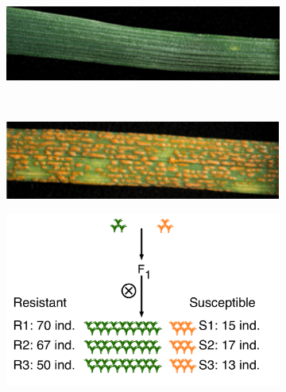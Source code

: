 \label{sub:mappingPopulation}
\begin{figure}
    \centering
     
     \begin{subfigure}[b]{0.4\textwidth}
        \caption{}
        \includegraphics[width=1\textwidth]{Yr15/Figures/population/Yr15Photo.png}
        \label{fig:yr15.yr15Photo}
    \end{subfigure}
    ~
    \begin{subfigure}[b]{0.4\textwidth}
        \caption{}
        \includegraphics[width=1\textwidth]{Yr15/Figures/population/AVSPhoto.png}
        \label{fig:yr15:avsPhoto}
    \end{subfigure}

     \begin{subfigure}[b]{0.9\textwidth}
     \caption{}
        \includegraphics[width=1\textwidth]{Yr15/Figures/population/F2Population.pdf} 
    \label{fig:yr15:f2}
  \end{subfigure}


\end{figure}
